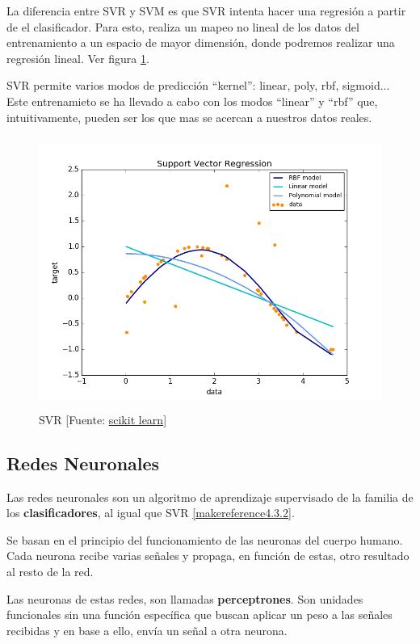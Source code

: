 	La diferencia entre SVR y SVM es que SVR intenta hacer una regresión a partir de el clasificador. Para esto, realiza un mapeo no lineal de los datos del entrenamiento a un espacio de mayor dimensión, donde podremos realizar una regresión lineal. Ver figura \ref{svr}.

	SVR permite varios modos de predicción ``kernel'': linear, poly, rbf, sigmoid...
	Este entrenamieto se ha llevado a cabo con los modos ``linear'' y ``rbf'' que, intuitivamente, pueden ser los que mas se acercan a nuestros datos reales.

	\begin{figure}[htb]
		\begin{center}
			\includegraphics[height=3.5in]{figures/svr.png}
			\caption{SVR [Fuente: \href{http://scikit-learn.org/stable/auto_examples/svm/plot_svm_regression.html}{scikit learn}] }
		\end{center}
		\label{svr}
	\end{figure}
	
	\subsection{Redes Neuronales}
	\label{makereference4.3.3}
	Las redes neuronales son un algoritmo de aprendizaje supervisado de la familia de los \textbf{clasificadores}, al igual que SVR \ref{makereference4.3.2}.

	Se basan en el principio del funcionamiento de las neuronas del cuerpo humano. Cada neurona recibe varias señales y propaga, en función de estas, otro resultado al resto de la red.

	Las neuronas de estas redes, son llamadas \textbf{perceptrones}. Son unidades funcionales sin una función específica que buscan aplicar un peso a las señales recibidas y en base a ello, envía un señal a otra neurona.

